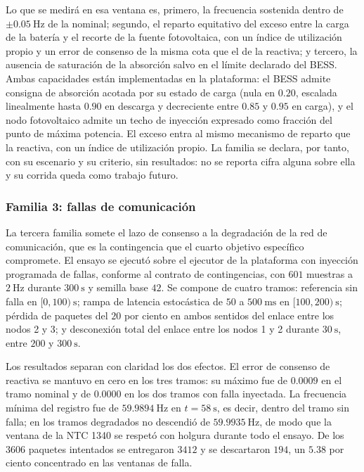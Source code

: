 Lo que se medirá en esa ventana es, primero, la frecuencia sostenida dentro de $\pm 0.05\ \text{Hz}$ de la nominal; segundo, el reparto equitativo del exceso entre la carga de la batería y el recorte de la fuente fotovoltaica, con un índice de utilización propio y un error de consenso de la misma cota que el de la reactiva; y tercero, la ausencia de saturación de la absorción salvo en el límite declarado del BESS. Ambas capacidades están implementadas en la plataforma: el BESS admite consigna de absorción acotada por su estado de carga (nula en $0.20$, escalada linealmente hasta $0.90$ en descarga y decreciente entre $0.85$ y $0.95$ en carga), y el nodo fotovoltaico admite un techo de inyección expresado como fracción del punto de máxima potencia. El exceso entra al mismo mecanismo de reparto que la reactiva, con un índice de utilización propio. La familia se declara, por tanto, con su escenario y su criterio, sin resultados: no se reporta cifra alguna sobre ella y su corrida queda como trabajo futuro.

\subsubsection{Familia 3: fallas de comunicación}

La tercera familia somete el lazo de consenso a la degradación de la red de comunicación, que es la contingencia que el cuarto objetivo específico compromete. El ensayo se ejecutó sobre el ejecutor de la plataforma con inyección programada de fallas, conforme al contrato de contingencias, con $601$ muestras a $2\ \text{Hz}$ durante $300\ \text{s}$ y semilla base $42$. Se compone de cuatro tramos: referencia sin falla en $[0, 100)\ \text{s}$; rampa de latencia estocástica de $50$ a $500\ \text{ms}$ en $[100, 200)\ \text{s}$; pérdida de paquetes del $20$ por ciento en ambos sentidos del enlace entre los nodos 2 y 3; y desconexión total del enlace entre los nodos 1 y 2 durante $30\ \text{s}$, entre $200$ y $300\ \text{s}$.

Los resultados separan con claridad los dos efectos. El error de consenso de reactiva se mantuvo en cero en los tres tramos: su máximo fue de $0.0009$ en el tramo nominal y de $0.0000$ en los dos tramos con falla inyectada. La frecuencia mínima del registro fue de $59.9894\ \text{Hz}$ en $t = 58\ \text{s}$, es decir, dentro del tramo sin falla; en los tramos degradados no descendió de $59.9935\ \text{Hz}$, de modo que la ventana de la NTC 1340 se respetó con holgura durante todo el ensayo. De los $3606$ paquetes intentados se entregaron $3412$ y se descartaron $194$, un $5.38$ por ciento concentrado en las ventanas de falla.

